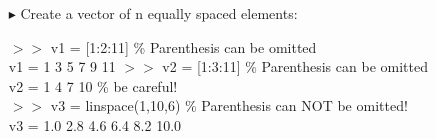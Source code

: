 \documentclass[xcolor={dvipsnames,rgb}, aspectratio=169]{beamer}
\begin{document}
\begin{frame}{}
    \begin{itemize}
        \item[$\blacktriangleright$] Create a vector of n equally spaced elements:
              \begin{tcolorbox}[colback=white,colframe=bluepoli]
                  $>>$ v1 = [1:2:11] \color{codegreen}\% Parenthesis can be omitted\\
                  \color{black}
                  v1 = \hspace{3em} 1 \hspace{3em} 3 \hspace{3em} 5 \hspace{3em} 7 \hspace{3em} 9 \hspace{3em} 11
                  \tcblower
                  $>>$ v2 = [1:3:11] \color{codegreen}\% Parenthesis can be omitted\\
                  \color{black}
                  v2 = \hspace{3em} 1 \hspace{3em} 4 \hspace{3em} 7 \hspace{3em} 10
                  \color{codegreen} \% be careful! \DrawLine \\
                  \color{black}
                  $>>$ v3 = linspace(1,10,6) \color{codegreen} \% Parenthesis can NOT be omitted!\\
                  \color{black}
                  v3 = \hspace{3em} 1.0 \hspace{3em} 2.8 \hspace{3em} 4.6 \hspace{3em} 6.4 \hspace{3em} 8.2 \hspace{3em} 10.0
              \end{tcolorbox}
    \end{itemize}
\end{frame}
\end{document}
